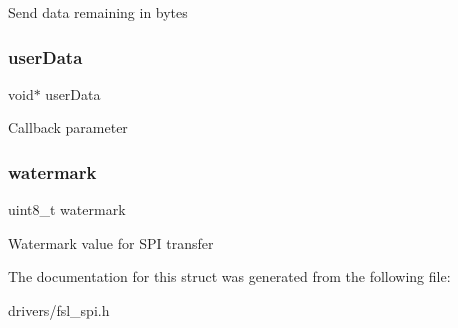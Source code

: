 Send data remaining in bytes \mbox{\label{struct__spi__master__handle_a2e294dd14122c554baa0665072b4ca7a}} 
\subsubsection{\texorpdfstring{userData}{userData}}
{\footnotesize\ttfamily void$\ast$ user\+Data}

Callback parameter \mbox{\label{struct__spi__master__handle_a3585201b190b39d2d702daa9192323a3}} 
\subsubsection{\texorpdfstring{watermark}{watermark}}
{\footnotesize\ttfamily uint8\+\_\+t watermark}

Watermark value for S\+PI transfer 

The documentation for this struct was generated from the following file\+:\begin{DoxyCompactItemize}
\item 
drivers/fsl\+\_\+spi.\+h\end{DoxyCompactItemize}
